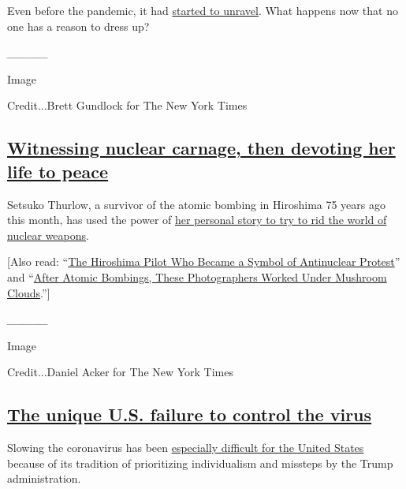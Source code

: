 Even before the pandemic, it had
\href{https://www.nytimes.com/interactive/2020/08/06/magazine/fashion-sweatpants.html}{started
to unravel}. What happens now that no one has a reason to dress up?

\emph{\_\_\_\_\_}

Image

Credit...Brett Gundlock for The New York Times

\hypertarget{witnessing-nuclear-carnage-then-devoting-her-life-to-peace}{%
\subsection{\texorpdfstring{\href{https://www.nytimes.com/2020/08/06/world/asia/hiroshima-japan-setsuko-thurlow.html}{Witnessing
nuclear carnage, then devoting her life to
peace}}{Witnessing nuclear carnage, then devoting her life to peace}}\label{witnessing-nuclear-carnage-then-devoting-her-life-to-peace}}

Setsuko Thurlow, a survivor of the atomic bombing in Hiroshima 75 years
ago this month, has used the power of
\href{https://www.nytimes.com/2020/08/06/world/asia/hiroshima-japan-setsuko-thurlow.html}{her
personal story to try to rid the world of nuclear weapons}.

{[}Also read:
``\href{https://www.nytimes.com/2020/08/06/magazine/hiroshima-claude-eatherly-antinuclear.html}{The
Hiroshima Pilot Who Became a Symbol of Antinuclear Protest}'' and
``\href{https://www.nytimes.com/2020/08/06/world/asia/hiroshima-nagasaki-japan-photos.html}{After
Atomic Bombings, These Photographers Worked Under Mushroom Clouds}.''{]}

\emph{\_\_\_\_\_}

Image

Credit...Daniel Acker for The New York Times

\hypertarget{the-unique-us-failure-to-control-the-virus}{%
\subsection{\texorpdfstring{\href{https://www.nytimes.com/2020/08/06/us/coronavirus-us.html}{The
unique U.S. failure to control the
virus}}{The unique U.S. failure to control the virus}}\label{the-unique-us-failure-to-control-the-virus}}

Slowing the coronavirus has been
\href{https://www.nytimes.com/2020/08/06/us/united-states-failure-coronavirus.html}{especially
difficult for the United States} because of its tradition of
prioritizing individualism and missteps by the Trump administration.

